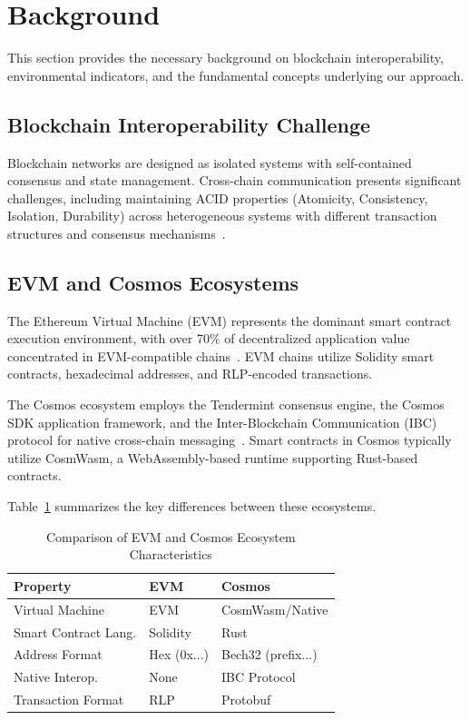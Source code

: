 \documentclass[conference,10pt]{IEEEtran}
\begin{document}
\section{Background}
\label{sec:background}

This section provides the necessary background on blockchain interoperability, environmental indicators, and the fundamental concepts underlying our approach.

\subsection{Blockchain Interoperability Challenge}

Blockchain networks are designed as isolated systems with self-contained consensus and state management. Cross-chain communication presents significant challenges, including maintaining ACID properties (Atomicity, Consistency, Isolation, Durability) across heterogeneous systems with different transaction structures and consensus mechanisms~\cite{wang2021}.

\subsection{EVM and Cosmos Ecosystems}

The Ethereum Virtual Machine (EVM) represents the dominant smart contract execution environment, with over 70\% of decentralized application value concentrated in EVM-compatible chains~\cite{defillama2024}. EVM chains utilize Solidity smart contracts, hexadecimal addresses, and RLP-encoded transactions.

The Cosmos ecosystem employs the Tendermint consensus engine, the Cosmos SDK application framework, and the Inter-Blockchain Communication (IBC) protocol for native cross-chain messaging~\cite{ibc2024}. Smart contracts in Cosmos typically utilize CosmWasm, a WebAssembly-based runtime supporting Rust-based contracts.

Table~\ref{tab:comparison} summarizes the key differences between these ecosystems.

\begin{table}[t]
\centering
\caption{Comparison of EVM and Cosmos Ecosystem Characteristics}
\label{tab:comparison}
\begin{tabular}{@{}lll@{}}
\toprule
\textbf{Property} & \textbf{EVM} & \textbf{Cosmos} \\
\midrule
Virtual Machine & EVM & CosmWasm/Native \\
Smart Contract Lang. & Solidity & Rust \\
Address Format & Hex (0x...) & Bech32 (prefix...) \\
Native Interop. & None & IBC Protocol \\
Transaction Format & RLP & Protobuf \\
\bottomrule
\end{tabular}
\end{table}
\end{document}

